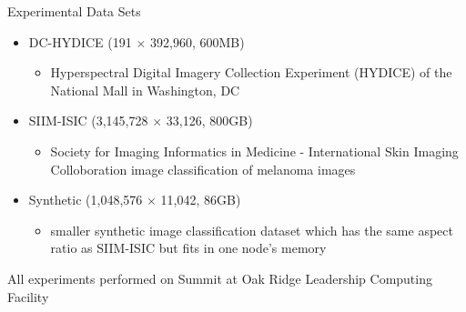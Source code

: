 \documentclass{beamer}
\begin{document}
\begin{frame}{Experimental Data Sets}
    \begin{itemize}
        \item DC-HYDICE (191 $\times$ 392{,}960, 600MB)
        \begin{itemize}
            \item Hyperspectral Digital Imagery Collection Experiment (HYDICE) of the National Mall in Washington, DC
        \end{itemize}
        \vfill
        \item SIIM-ISIC (3{,}145{,}728 $\times$ 33{,}126, 800GB)
        \begin{itemize}
            \item Society for Imaging Informatics in Medicine - International Skin Imaging Colloboration image classification of melanoma images
        \end{itemize}
        \vfill
        \item Synthetic (1{,}048{,}576 $\times$ 11{,}042, 86GB)
        \begin{itemize}
            \item smaller synthetic image classification dataset which has the same aspect ratio as SIIM-ISIC but fits in one node's memory
        \end{itemize}
    \end{itemize}
    \vfill
    \begin{center}
    \scriptsize
    	All experiments performed on Summit at Oak Ridge Leadership Computing Facility
    \end{center}
\end{frame}

\newcommand{\figscal}{.75\textwidth}
\end{document}
